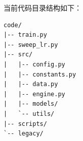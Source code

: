 \documentclass[a4paper]{article}
\begin{document}
\noindent 当前代码目录结构如下：
\begin{verbatim}
code/
|-- train.py
|-- sweep_lr.py
|-- src/
|   |-- config.py
|   |-- constants.py
|   |-- data.py
|   |-- engine.py
|   |-- models/
|   `-- utils/
|-- scripts/
`-- legacy/
\end{verbatim}

\newpage


\end{document}
